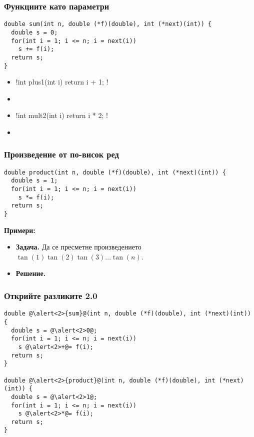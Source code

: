 \documentclass{beamer}
\begin{document}
\begin{frame}[fragile]
  \frametitle{Функциите като параметри}

\begin{lstlisting}
double sum(int n, double (*f)(double), int (*next)(int)) {
  double s = 0;
  for(int i = 1; i <= n; i = next(i))
    s += f(i);
  return s;
}
\end{lstlisting}
  \pause
  \begin{itemize}[<+->]
  \item \lst!int plus1(int i) { return i + 1; }!
  \item {} \eqv {}
  \item \lst!int mult2(int i) { return i * 2; }!
  \item {} \eqv {}
  \end{itemize}
\end{frame}

\begin{frame}[fragile]
  \frametitle{Произведение от по-висок ред}

\begin{lstlisting}
double product(int n, double (*f)(double), int (*next)(int)) {
  double s = 1;
  for(int i = 1; i <= n; i = next(i))
    s *= f(i);
  return s;
}
\end{lstlisting}
  \pause
  \textbf{Примери:}
  \begin{itemize}[<+->]
  \item \textbf{Задача.} Да се пресметне произведението $\tan(1)\tan(2)\tan(3)\ldots\tan(n)$.
  \item \textbf{Решение.} 
  \end{itemize}
\end{frame}

\begin{frame}[fragile]
  \frametitle{Открийте разликите 2.0}

\begin{lstlisting}
double @\alert<2>{sum}@(int n, double (*f)(double), int (*next)(int)) {
  double s = @\alert<2>0@;
  for(int i = 1; i <= n; i = next(i))
    s @\alert<2>+@= f(i);
  return s;
}

double @\alert<2>{product}@(int n, double (*f)(double), int (*next)(int)) {
  double s = @\alert<2>1@;
  for(int i = 1; i <= n; i = next(i))
    s @\alert<2>*@= f(i);
  return s;
}
\end{lstlisting}
\end{frame}
\end{document}
